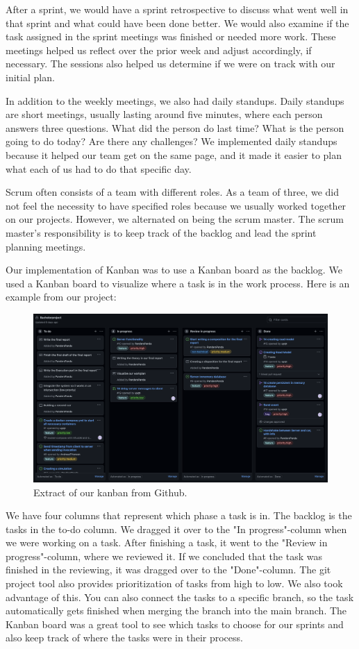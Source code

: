 After a sprint, we would have a sprint retrospective to discuss what went well in that sprint and what could have been done better. We would also examine if the task assigned in the sprint meetings was finished or needed more work. These meetings helped us reflect over the prior week and adjust accordingly, if necessary. The sessions also helped us determine if we were on track with our initial plan. 
 
In addition to the weekly meetings, we also had daily standups. Daily standups are short meetings, usually lasting around five minutes, where each person answers three questions. What did the person do last time? What is the person going to do today? Are there any challenges? We implemented daily standups because it helped our team get on the same page, and it made it easier to plan what each of us had to do that specific day.

Scrum often consists of a team with different roles. As a team of three, we did not feel the necessity to have specified roles because we usually worked together on our projects. However, we alternated on being the scrum master. The scrum master's responsibility is to keep track of the backlog and lead the sprint planning meetings.

Our implementation of Kanban was to use a Kanban board as the backlog. We used a Kanban board to visualize where a task is in the work process. Here is an example from our project:

\begin{figure}[h!]
	\centering
	\includegraphics[width=1\linewidth]{figures/kanban_screenshot}
	\caption[kanban screenshot]{Extract of our kanban from Github.}
	\label{fig:kanbanscreenshot}
\end{figure}

We have four columns that represent which phase a task is in. The backlog is the tasks in the to-do column. We dragged it over to the "In progress"-column when we were working on a task. After finishing a task, it went to the "Review in progress"-column, where we reviewed it. If we concluded that the task was finished in the reviewing, it was dragged over to the "Done"-column. The git project tool also provides prioritization of tasks from high to low. We also took advantage of this. You can also connect the tasks to a specific branch, so the task automatically gets finished when merging the branch into the main branch. The Kanban board was a great tool to see which tasks to choose for our sprints and also keep track of where the tasks were in their process.

